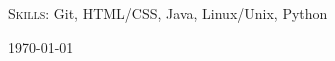 \documentclass[12pt, a4paper]{article}
\begin{document}

\textsc{Skills}: Git, HTML/CSS, Java, Linux/Unix, Python\\

\vspace{-6mm}
\begin{center}
{\scriptsize\today\- }
\end{center}
\end{document}
